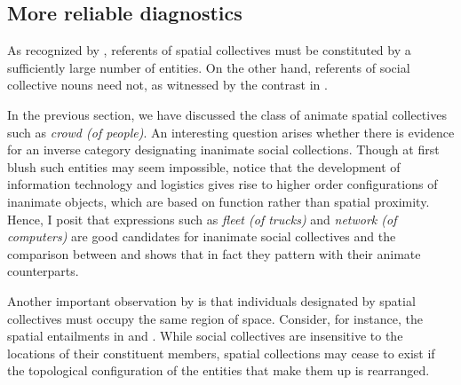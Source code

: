 \documentclass[output=paper]{langscibook}
\begin{document}
\subsection{More reliable diagnostics}\label{wan:sec:more-reliable-diagnostics}

\noindent As recognized by \citet{henderson2017swarms}, referents of spatial collectives must be constituted by a sufficiently large number of entities. On the other hand, referents of social collective nouns need not, as witnessed by the contrast in .
	
	\ea\judgewidth{\#}\label{wan:ex:plurality} 
		\label{wan:ex:plurality-family} 
		\label{wan:ex:plurality-grove}
    \z	
    \z

\noindent In the previous section, we have discussed the class of animate spatial collectives such as \textit{crowd (of people)}. An interesting question arises whether there is evidence for an inverse category designating inanimate social collections. Though at first blush such entities may seem impossible, notice that the development of information technology and logistics gives rise to higher order configurations of inanimate objects, which are based on function rather than spatial proximity. Hence, I posit that expressions such as \textit{fleet (of trucks)} and \textit{network (of computers)} are good candidates for inanimate social collectives and the comparison between  and  shows that in fact they pattern with their animate counterparts.

	\label{wan:ex:plurality-fleet}
    \z

\noindent Another important observation by \citeauthor{henderson2017swarms} is that individuals designated by spatial collectives must occupy the same region of space. Consider, for instance, the spatial entailments in  and . While social collectives are insensitive to the locations of their constituent members, spatial collections may cease to exist if the topological configuration of the entities that make them up is rearranged.
	
	\ea\judgewidth{$\nvDash$}\label{wan:ex:entailment-committee} 
		\label{wan:ex:entailment-committee1} 
		\label{wan:ex:entailment-committee2} 
	\z	
	\ex\judgewidth{$\vDash$}\label{wan:ex:entailment-bouquet}		
		\label{wan:ex:entailment-bouquet1} 
		\label{wan:ex:entailment-bouquet2}
    \z	
    \z
\end{document}

